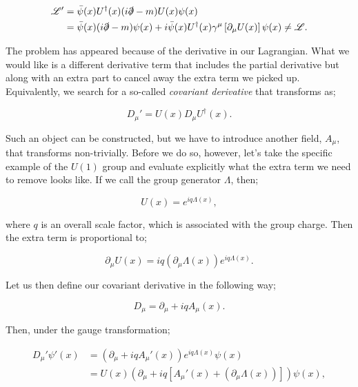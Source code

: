 \begin{equation}
\begin{split}
\mathscr{L}'& = \bar{\psi}(x)U^\dagger(x)(i \slashed{\partial} - m) U(x)\psi(x)\\
& = \bar{\psi}(x)(i \slashed{\partial} - m)\psi(x) + i \bar{\psi}(x) U^\dagger(x)\gamma^\mu\left[\partial_\mu U(x) \right]\psi(x) \neq \mathscr{L}.
\end{split}
\end{equation}

The problem has appeared because of the derivative in our Lagrangian. What we would like is a different derivative term that includes the partial derivative but along with an extra part to cancel away the extra term we picked up. Equivalently, we search for a so-called \emph{covariant derivative} that transforms as;

\begin{equation}
D_\mu ' = U(x) D_\mu U^\dagger (x).
\end{equation}

Such an object can be constructed, but we have to introduce another field, $A_\mu$, that transforms non-trivially. Before we do so, however, let's take the specific example of the $U(1)$ group and evaluate explicitly what the extra term we need to remove looks like. If we call the group generator $\Lambda$, then;

\begin{equation}
U(x) = e^{i q \Lambda(x)},
\end{equation}

where $q$ is an overall scale factor, which is associated with the group charge. Then the extra term is proportional to;

\begin{equation}
\partial_\mu U(x) = i q (\partial_\mu \Lambda(x)) e^{i q \Lambda(x)}.
\end{equation}

Let us then define our covariant derivative in the following way;

\begin{equation}
\label{eqn:covder}
D_\mu = \partial_\mu + i q A_\mu(x).
\end{equation}

Then, under the gauge transformation;

\begin{equation}
\begin{split}
D_\mu' \psi'(x) & = (\partial_\mu + i q A_\mu'(x)) e^{i q \Lambda(x)} \psi(x) \\
& = U(x)(\partial_\mu + iq[A_\mu'(x) + (\partial_\mu \Lambda(x))])\psi(x),
\end{split}
\end{equation}

